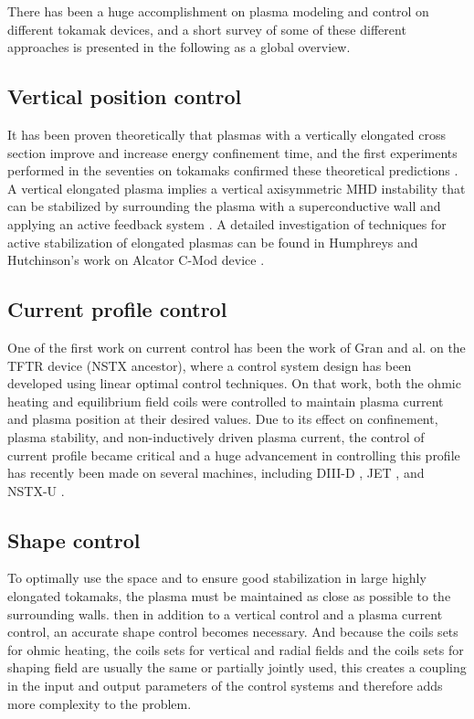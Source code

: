 \documentclass[12pt,lot, lof]{puthesis}
\begin{document}
There has been a huge accomplishment on plasma modeling and control on different tokamak devices, and a short survey of some of these different approaches is presented in the following as a global overview.

\subsection{Vertical position control}
It has been proven theoretically that plasmas with a vertically elongated cross section improve and increase energy confinement time, and the first experiments performed in the seventies on tokamaks confirmed these theoretical predictions \cite{Pironti05,Robinson78}. A vertical elongated plasma implies a vertical axisymmetric MHD instability that can be stabilized by surrounding the plasma with a superconductive wall \cite{Mori87, Okabayashi74, Blum81} and applying an active feedback system \cite{Rebhan78}. A detailed investigation of techniques for active stabilization of elongated plasmas can be found in Humphreys and Hutchinson's work on Alcator C-Mod device \cite{Humphreys89}.

\subsection{{Current profile control}}
One of the first work on current control has been the work of Gran and al. \cite{Gran77} on the TFTR device (NSTX ancestor), where a control system design has been developed using linear optimal control techniques. On that work, both the ohmic heating and equilibrium field coils were controlled to maintain plasma current and plasma position at their desired values.
Due to its effect on confinement, plasma stability, and non-inductively driven plasma current, the control of current profile became critical and a huge advancement in controlling this profile has recently been made on several machines, including DIII-D \cite{Moreau11}, JET \cite{Moreau03, Moreau08, Laborde05}, and NSTX-U \cite{Boyer15}.

\subsection{{Shape control}} 
To optimally use the space and to ensure good stabilization in large highly elongated tokamaks, the plasma must be maintained as close as possible to the surrounding walls. then in addition to a vertical control and a plasma current control, an accurate shape control becomes necessary. And because the coils sets for ohmic heating, the coils sets for vertical and radial fields and the coils sets for shaping field are usually the same or partially jointly used, this creates a coupling in the input and output parameters of the control systems and therefore adds more complexity to the problem.
\end{document}

